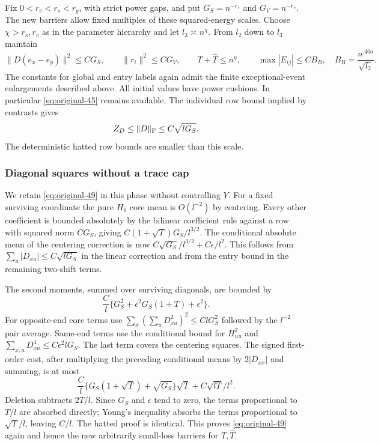 Fix $0<r_v<r_s<r_g$, with strict power gaps, and put
$G_S=n^{-r_s}$ and $G_V=n^{-r_v}$.
The new barriers allow fixed multiples of these squared-energy
scales.  Choose $\chi>r_s,r_v$ as in the parameter hierarchy and
let $l_3\asymp n^\chi$.  From $l_2$ down to $l_3$ maintain
\[
 \|D(e_x-e_y)\|^2\le C G_S,\qquad
 \|r_i\|^2\le C G_V,\qquad
 T+\widehat T\le n^\eta,\qquad
 \max|E_{ij}|\le C B_B,
 \quad B_B=\frac{n^{.40a}}{\sqrt{l_2}}.
\]
The constants for global and entry labels again admit the finite
exceptional-event enlargements described above.  All initial values
have power cushions.  In particular \eqref{eq:original-45} remains
available.  The individual row bound implied by contrasts gives
\begin{equation}
 Z_D\le\|D\|_{\rm F}\le C\sqrt{lG_S}.
 \label{eq:original-57}
\end{equation}
The deterministic hatted row bounds are smaller than this scale.

\subsubsection*{Diagonal squares without a trace cap}
We retain \eqref{eq:original-49} in this phase without controlling
$Y$.  For a fixed surviving coordinate the pure $H_0$ core mean
is $O(l^{-2})$ by centering.  Every other coefficient is bounded
absolutely by the bilinear coefficient rule against a row with
squared norm $CG_S$, giving
$C(1+\sqrt T)G_S/l^{3/2}$.
The conditional absolute mean of the centering correction is now
$C\sqrt{G_S}/l^{3/2}+C\epsilon/l^2$.
This follows from $\sum_u|D_{xu}|\le C\sqrt{lG_S}$ in the
linear correction and from the entry bound in the remaining
two-shift terms.

The second moments, summed over surviving diagonals, are bounded
by
\[
 \frac C l\{G_S^2+\epsilon^2G_S(1+T)+\epsilon^2\}.
\]
For opposite-end core terms use
$\sum_x(\sum_uD_{xu}^2)^2\le C lG_S^2$ followed by the
$l^{-2}$ pair average.  Same-end terms use the conditional bound
for $H_{uu}^2$ and
$\sum_{x,u}D_{xu}^4\le C\epsilon^2lG_S$.
The last term covers the centering squares.
The signed first-order cost, after multiplying the preceding
conditional means by $2|D_{xx}|$ and summing, is at most
\[
 \frac C l
    \{G_S(1+\sqrt T)+\sqrt{G_S}\}\sqrt T
       +C\sqrt{lT}/l^2.
\]
Deletion subtracts $2T/l$.  Since $G_S$ and $\epsilon$ tend to
zero, the terms proportional to $T/l$ are absorbed directly;
Young's inequality absorbs the terms proportional to
$\sqrt T/l$, leaving $C/l$.  The hatted proof is identical.
This proves \eqref{eq:original-49} again and hence the new
arbitrarily small-loss barriers for $T,\widehat T$.

